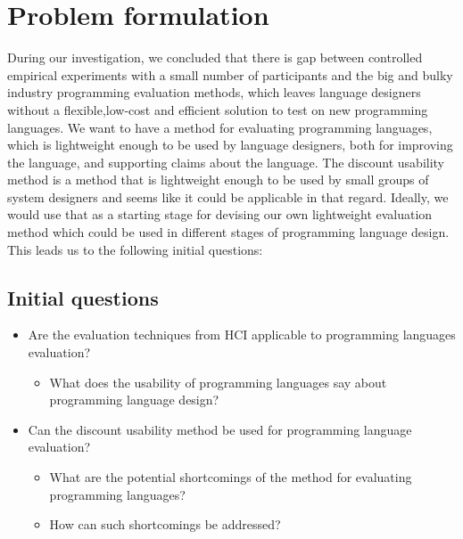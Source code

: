 \section{Problem formulation}
\label{section:problem formulation}
During our investigation, we concluded that there is gap between  controlled empirical experiments with a small number of participants and the big and bulky industry programming evaluation methods\cite{AliceCS1}\cite{BlockOrNot}\cite{FromScratch}, which leaves language designers without a flexible,low-cost and efficient solution to test on new programming languages. We want to have a method for evaluating programming languages, which is lightweight enough to be used by language designers, both for improving the language, and supporting claims about the language. The discount usability method is a method that is lightweight enough to be used by small groups of system designers and seems like it could be applicable in that regard. Ideally, we would use that as a starting stage for devising our own lightweight evaluation method which could be used in different stages of programming language design. This leads us to the following initial questions:

\subsection{Initial questions}
\begin{itemize}
\item Are the evaluation techniques from HCI applicable to programming languages evaluation?
	\begin{itemize}
		\item What does the usability of programming languages say about programming language design?
	\end{itemize}
\item Can the discount usability method be used for programming language evaluation?
	\begin{itemize}
		\item What are the potential shortcomings of the method for evaluating programming languages?
		\item How can such shortcomings be addressed?
	\end{itemize}
\end{itemize}
